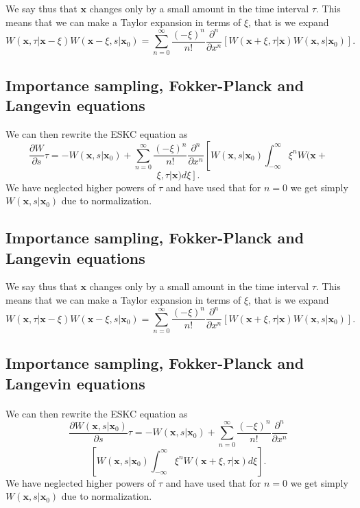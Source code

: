 \documentclass[%
oneside,                 %
final,                   %
10pt]{article}
\begin{document}
We say thus that $\mathbf{x}$ changes only by a small amount in the time interval $\tau$. 
This means that we can make a Taylor expansion in terms of $\xi$, that is we
expand
\[
W(\mathbf{x},\tau|\mathbf{x}-\xi)W(\mathbf{x}-\xi,s|\mathbf{x}_0) =
\sum_{n=0}^{\infty}\frac{(-\xi)^n}{n!}\frac{\partial^n}{\partial x^n}\left[W(\mathbf{x}+\xi,\tau|\mathbf{x})W(\mathbf{x},s|\mathbf{x}_0)
\right].
\]

\subsection{Importance sampling, Fokker-Planck and Langevin equations}

We can then rewrite the ESKC equation as 
\[
\frac{\partial W}{\partial s}\tau=-W(\mathbf{x},s|\mathbf{x}_0)+
\sum_{n=0}^{\infty}\frac{(-\xi)^n}{n!}\frac{\partial^n}{\partial x^n}
\left[W(\mathbf{x},s|\mathbf{x}_0)\int_{-\infty}^{\infty} \xi^nW(\mathbf{x}+\right.
\]
\[
\left. \xi,\tau|\mathbf{x})d\xi\right].
\]
We have neglected higher powers of $\tau$ and have used that for $n=0$ 
we get simply $W(\mathbf{x},s|\mathbf{x}_0)$ due to normalization.

\subsection{Importance sampling, Fokker-Planck and Langevin equations}

We say thus that $\mathbf{x}$ changes only by a small amount in the time interval $\tau$. 
This means that we can make a Taylor expansion in terms of $\xi$, that is we
expand
\[
W(\mathbf{x},\tau|\mathbf{x}-\xi)W(\mathbf{x}-\xi,s|\mathbf{x}_0) =
\sum_{n=0}^{\infty}\frac{(-\xi)^n}{n!}\frac{\partial^n}{\partial x^n}\left[W(\mathbf{x}+\xi,\tau|\mathbf{x})W(\mathbf{x},s|\mathbf{x}_0)
\right].
\]

\subsection{Importance sampling, Fokker-Planck and Langevin equations}

\paragraph{}
We can then rewrite the ESKC equation as 
\[
\frac{\partial W(\mathbf{x},s|\mathbf{x}_0)}{\partial s}\tau=-W(\mathbf{x},s|\mathbf{x}_0)+
\sum_{n=0}^{\infty}\frac{(-\xi)^n}{n!}\frac{\partial^n}{\partial x^n}
\]
\[
\left[W(\mathbf{x},s|\mathbf{x}_0)\int_{-\infty}^{\infty} \xi^nW(\mathbf{x}+\xi,\tau|\mathbf{x})d\xi\right].
\]
We have neglected higher powers of $\tau$ and have used that for $n=0$ 
we get simply $W(\mathbf{x},s|\mathbf{x}_0)$ due to normalization.
\end{document}
